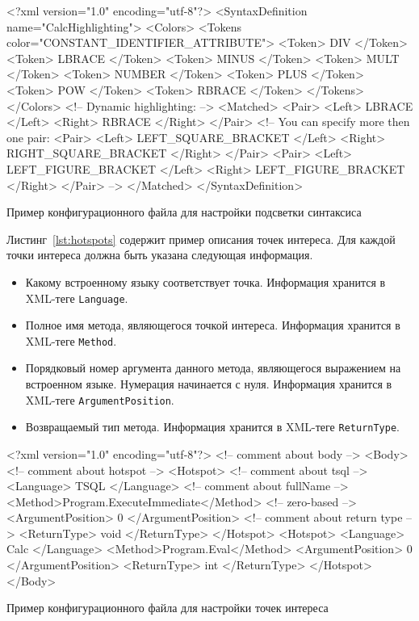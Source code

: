 \begin{listing}[H]
    \begin{pyglist}[language=xml,numbers=left,numbersep=5pt]
<?xml version="1.0" encoding="utf-8"?>
<SyntaxDefinition name="CalcHighlighting">
    <Colors>
        <Tokens color="CONSTANT_IDENTIFIER_ATTRIBUTE">
            <Token> DIV </Token>
            <Token> LBRACE </Token>
            <Token> MINUS </Token>
            <Token> MULT </Token>
            <Token> NUMBER </Token>
            <Token> PLUS </Token>
            <Token> POW </Token>
            <Token> RBRACE </Token>
        </Tokens>
    </Colors>
<!-- Dynamic highlighting: -->
    <Matched>
        <Pair>
            <Left> LBRACE </Left>
            <Right> RBRACE </Right>
        </Pair>
<!-- You can specify more then one pair:        
        <Pair>
            <Left> LEFT_SQUARE_BRACKET </Left>
            <Right> RIGHT_SQUARE_BRACKET </Right>
        </Pair>
        <Pair>
            <Left> LEFT_FIGURE_BRACKET </Left>
            <Right> LEFT_FIGURE_BRACKET </Right>
        </Pair>
-->        
    </Matched>
</SyntaxDefinition>
    \end{pyglist}
\caption{Пример конфигурационного файла для настройки подсветки синтаксиса}
\label{lst:codeHighlighting}
\end{listing}

Листинг~\ref{lst:hotspots} содержит пример описания точек интереса. Для каждой точки интереса должна быть указана следующая информация.
\begin{itemize}
    \item Какому встроенному языку соответствует точка. Информация хранится в XML-теге \verb|Language|.
    \item Полное имя метода, являющегося точкой интереса. Информация хранится в XML-теге \verb|Method|.
    \item Порядковый номер аргумента данного метода, являющегося выражением на встроенном языке. Нумерация начинается с нуля. Информация хранится в XML-теге \verb|ArgumentPosition|. 
    \item Возвращаемый тип метода.  Информация хранится в XML-теге \verb|ReturnType|. 
\end{itemize}

\begin{listing}[H]
    \begin{pyglist}[language=xml,numbers=left,numbersep=5pt]
<?xml version="1.0" encoding="utf-8"?>
<!-- comment about body -->
<Body>
    <!-- comment about hotspot -->
  <Hotspot>
      <!-- comment about tsql -->
      <Language> TSQL </Language>
      <!-- comment about fullName -->
      <Method>Program.ExecuteImmediate</Method>
      <!-- zero-based -->
      <ArgumentPosition> 0 </ArgumentPosition>
      <!-- comment about return type -->
      <ReturnType> void </ReturnType>
  </Hotspot>
  <Hotspot>
      <Language> Calc </Language>
      <Method>Program.Eval</Method>
      <ArgumentPosition> 0 </ArgumentPosition>
      <ReturnType> int </ReturnType>
  </Hotspot>
</Body>
    \end{pyglist}
\caption{Пример конфигурационного файла для настройки точек интереса}
\label{lst:hotspots}
\end{listing}


